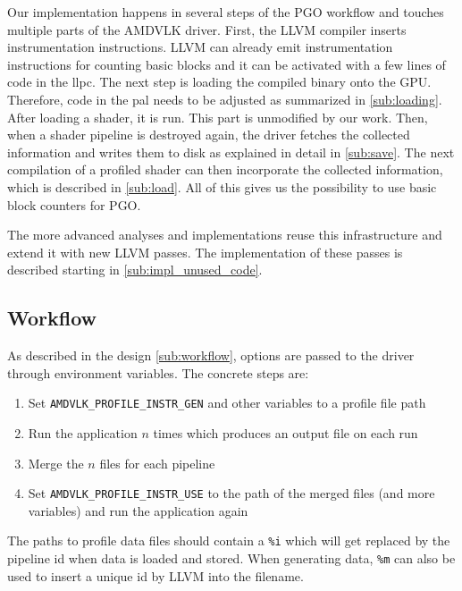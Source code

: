 \clearpage
{}
Our implementation happens in several steps of the PGO workflow and touches multiple parts of the AMDVLK driver.
First, the LLVM compiler inserts instrumentation instructions.
LLVM can already emit instrumentation instructions for counting basic blocks and it can be activated with a few lines of code in the \acrfull{llpc}.
The next step is loading the compiled binary onto the GPU. Therefore, code in the \acrfull{pal} needs to be adjusted as summarized in \cref{sub:loading}.
After loading a shader, it is run. This part is unmodified by our work.
Then, when a shader pipeline is destroyed again, the driver fetches the collected information and writes them to disk as explained in detail in \cref{sub:save}.
The next compilation of a profiled shader can then incorporate the collected information, which is described in \cref{sub:load}. All of this gives us the possibility to use basic block counters for PGO.

The more advanced analyses and implementations reuse this infrastructure and extend it with new LLVM passes. The implementation of these passes is described starting in \cref{sub:impl_unused_code}.

\subsection{Workflow}
\label{sub:impl_workflow}
As described in the design \cref{sub:workflow}, options are passed to the driver through environment variables.
The concrete steps are:
\begin{enumerate}
	\item Set \texttt{AMDVLK\_PROFILE\_INSTR\_GEN} and other variables to a profile file path
	\item Run the application $n$ times which produces an output file on each run
	\item Merge the $n$ files for each pipeline
	\item Set \texttt{AMDVLK\_PROFILE\_INSTR\_USE} to the path of the merged files (and more variables) and run the application again
\end{enumerate}
The paths to profile data files should contain a \texttt{\%i} which will get replaced by the pipeline id when data is loaded and stored.
When generating data, \texttt{\%m} can also be used to insert a unique id by LLVM into the filename.


